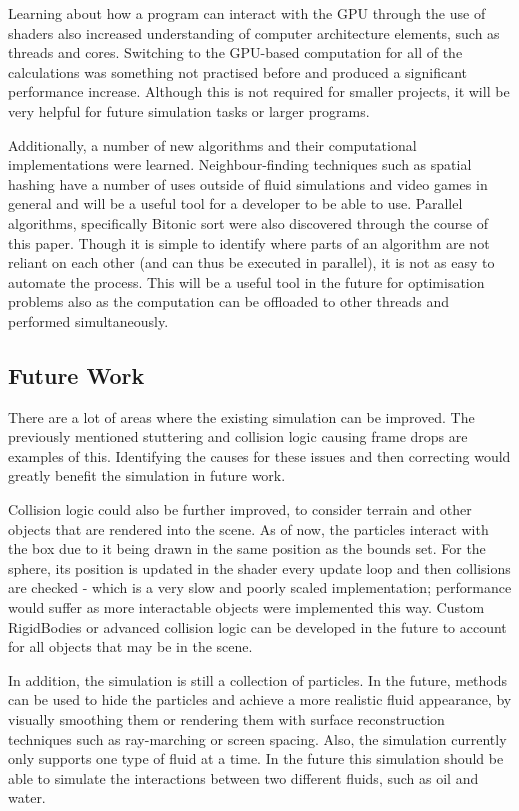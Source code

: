\documentclass[a4paper, 12pt]{article}
\begin{document}
    Learning about how a program can interact with the GPU through the use of shaders also increased understanding of computer architecture elements, such as threads and cores. Switching to the GPU-based computation for all of the calculations was something not practised before and produced a significant performance increase. Although this is not required for smaller projects, it will be very helpful for future simulation tasks or larger programs.
    
    Additionally, a number of new algorithms and their computational implementations were learned. Neighbour-finding techniques such as spatial hashing have a number of uses outside of fluid simulations and video games in general and will be a useful tool for a developer to be able to use. Parallel algorithms, specifically Bitonic sort were also discovered through the course of this paper. Though it is simple to identify where parts of an algorithm are not reliant on each other (and can thus be executed in parallel), it is not as easy to automate the process. This will be a useful tool in the future for optimisation problems also as the computation can be offloaded to other threads and performed simultaneously.

    \subsection{Future Work}

    There are a lot of areas where the existing simulation can be improved. The previously mentioned stuttering and collision logic causing frame drops are examples of this. Identifying the causes for these issues and then correcting would greatly benefit the simulation in future work.
    
    Collision logic could also be further improved, to consider terrain and other objects that are rendered into the scene. As of now, the particles interact with the box due to it being drawn in the same position as the bounds set. For the sphere, its position is updated in the shader every update loop and then collisions are checked - which is a very slow and poorly scaled implementation; performance would suffer as more interactable objects were implemented this way. Custom RigidBodies or advanced collision logic can be developed in the future to account for all objects that may be in the scene.

    In addition, the simulation is still a collection of particles. In the future, methods can be used to hide the particles and achieve a more realistic fluid appearance, by visually smoothing them or rendering them with surface reconstruction techniques such as ray-marching or screen spacing. Also, the simulation currently only supports one type of fluid at a time. In the future this simulation should be able to simulate the interactions between two different fluids, such as oil and water.
    
\end{document}
